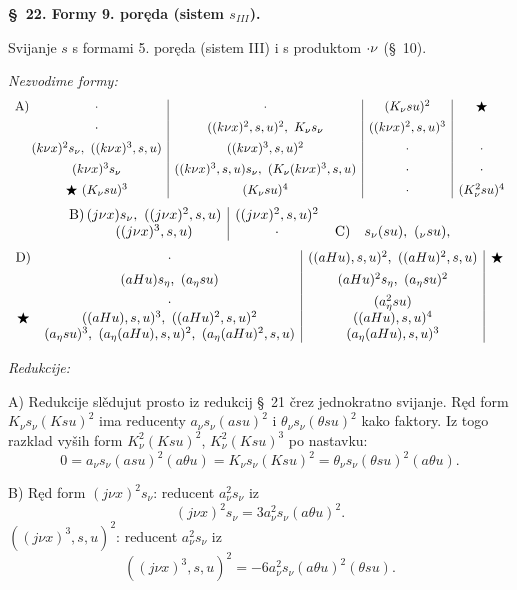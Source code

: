 \documentclass[11pt]{article}
\let\A\relax
\newcommand{\A}{\mathfrak A}
\begin{document}
\begin{center}
\textbf{\S\ 22. \quad Formy 9. poręda (sistem $s_{III}$).}
\end{center}

Svijanje $s$ s formami 5. poręda (sistem III) i s produktom $\A\cdot \nu$ (\S\ 10).

\noindent\textit{Nezvodime formy:}
\[
\begin{array}{c@{\,}c|c|c|c}
\text{A)}& \cdot & \cdot & (K_{\nu}su)^2 & \bigstar\\[0.45em]
& \cdot & ((k\nu x)^2,s,u)^2,\ K_{\nu}s_{\nu} & ((k\nu x)^2,s,u)^3 & \\[0.45em]
& (k\nu x)^2s_{\nu},\ ((k\nu x)^3,s,u) & ((k\nu x)^3,s,u)^2 & \cdot & \cdot\\[0.45em]
& (k\nu x)^3s_{\nu} & ((k\nu x)^3,s,u)s_{\nu},\ (K_{\nu}(k\nu x)^3,s,u) & \cdot & \cdot\\[0.45em]
& \bigstar\ (K_{\nu}su)^3 & (K_{\nu}su)^4 & \cdot & (K_{\nu}^2su)^4
\end{array}
\]
\[
\begin{array}{c@{\,}c|c@{\quad}c@{\,}c}
\text{B)}& (j\nu x)s_{\nu},\ ((j\nu x)^2,s,u) & ((j\nu x)^2,s,u)^2 && \\
& ((j\nu x)^3,s,u) & \cdot && \text{C)}\quad s_{\nu}(\A su),\ (\A_{\nu}su),
\end{array}
\]
\[
\begin{array}{c@{\quad}c|c|c}
\text{D)}& \cdot & ((aHu),s,u)^2,\ ((aHu)^2,s,u) & \bigstar\\[0.45em]
& (aHu)s_\eta,\ (a_\eta su) & (aHu)^2s_\eta,\ (a_\eta su)^2 & \\[0.45em]
& \cdot & (a_\eta^2su) & \\
\bigstar& ((aHu),s,u)^3,\ ((aHu)^2,s,u)^2 & ((aHu),s,u)^4 & \\
& (a_\eta su)^3,\ (a_\eta(aHu),s,u)^2,\ (a_\eta(aHu)^2,s,u) & (a_\eta(aHu),s,u)^3 &
\end{array}
\]

\noindent\textit{Redukcije:}

A) Redukcije slědujut prosto iz redukcij \S\ 21 črez jednokratno svijanje. Ręd form $K_{\nu}s_{\nu}(Ksu)^2$ ima reducenty $a_{\nu}s_{\nu}(asu)^2$ i $\theta_{\nu}s_{\nu}(\theta su)^2$ kako faktory. Iz togo razklad vyših form $K_{\nu}^2(Ksu)^2$, $K_{\nu}^2(Ksu)^3$ po nastavku:
\[
0=a_{\nu}s_{\nu}(asu)^2(a\theta u)=K_{\nu}s_{\nu}(Ksu)^2=\theta_{\nu}s_{\nu}(\theta su)^2(a\theta u).
\]

B) Ręd form $(j\nu x)^2s_{\nu}$: reducent $a_{\nu}^2s_{\nu}$ iz
\[
(j\nu x)^2s_{\nu}=3a_{\nu}^2s_{\nu}(a\theta u)^2.
\]
$((j\nu x)^3,s,u)^2$: reducent $a_{\nu}^2s_{\nu}$ iz
\[
((j\nu x)^3,s,u)^2=-6a_{\nu}^2s_{\nu}(a\theta u)^2(\theta su).
\]
\end{document}
